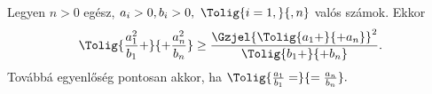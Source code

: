 Legyen $n>0$ egész, $a_{i}>0,b_{i}>0,\ \Tolig{i=1,}{,n}$ valós számok. Ekkor
$$
\Tolig{\frac{a_{1}^{2}}{b_{1}}+}{+\frac{a_{n}^{2}}{b_{n}}} \ge 
\frac{\Gzjel{ \Tolig{a_{1}+}{+a_{n}}}^{2}}{\Tolig{b_{1}+}{+b_{n}}}.
$$
Továbbá egyenlőség pontosan akkor, ha $\Tolig{\frac{a_{1}}{b_{1}}=}{=\frac{a_{n}}{b_{n}}}.$

